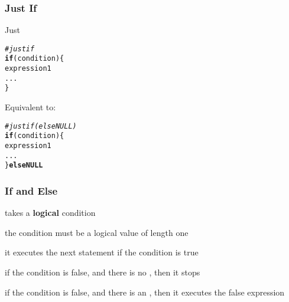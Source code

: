 \documentclass[12pt]{beamer}\usepackage[]{graphicx}\usepackage[]{color}
\makeatletter
\newcommand{\hlcom}[1]{\textcolor[rgb]{0.678,0.584,0.686}{\textit{#1}}}%
\newcommand{\hlstd}[1]{\textcolor[rgb]{0.345,0.345,0.345}{#1}}%
\newcommand{\hlkwa}[1]{\textcolor[rgb]{0.161,0.373,0.58}{\textbf{#1}}}%
\newenvironment{kframe}{%
 \def\at@end@of@kframe{}%
 \ifinner\ifhmode%
  \def\at@end@of@kframe{\end{minipage}}%
  \begin{minipage}{\columnwidth}%
 \fi\fi%
 \def\FrameCommand##1{\hskip\@totalleftmargin \hskip-\fboxsep
 \colorbox{shadecolor}{##1}\hskip-\fboxsep
     \hskip-\linewidth \hskip-\@totalleftmargin \hskip\columnwidth}%
 \MakeFramed {\advance\hsize-\width
   \@totalleftmargin\z@ \linewidth\hsize
   \@setminipage}}%
 {\par\unskip\endMakeFramed%
 \at@end@of@kframe}
\newenvironment{knitrout}{}{} %
\makeatother
\begin{document}
\begin{frame}[fragile]
\frametitle{Just If}

Just 
\begin{knitrout}\footnotesize
{}\color{fgcolor}\begin{kframe}
\begin{alltt}
\hlcom{# just if}
\hlkwa{if} \hlstd{(condition) \{}
  \hlstd{expression1}
  \hlstd{...}
\hlstd{\}}
\end{alltt}
\end{kframe}
\end{knitrout}

Equivalent to:
\begin{knitrout}\footnotesize
{}\color{fgcolor}\begin{kframe}
\begin{alltt}
\hlcom{# just if (else NULL)}
\hlkwa{if} \hlstd{(condition) \{}
  \hlstd{expression1}
  \hlstd{...}
\hlstd{\}} \hlkwa{else NULL}
\end{alltt}
\end{kframe}
\end{knitrout}

\end{frame}


\begin{frame}
\frametitle{If and Else}

\bi
  \item {} takes a \textbf{logical} condition
  \item the condition must be a logical value of length one
  \item it executes the next statement if the condition is true
  \item if the condition is false, and there is no , then it stops
  \item if the condition is false, and there is an , then it executes the false expression
\ei

\end{frame}

\end{document}
